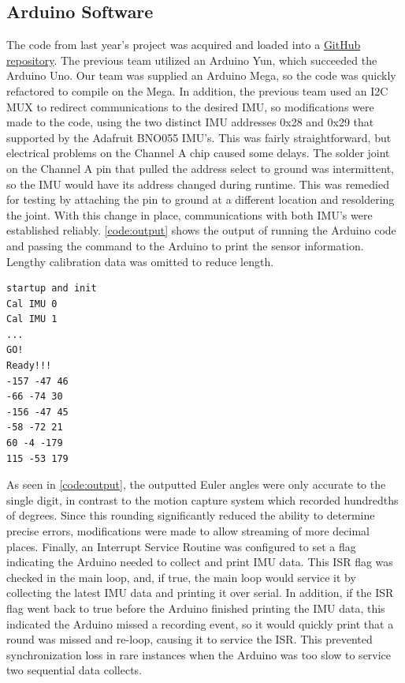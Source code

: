 \documentclass[letterpaper, 10 pt, conference]{ieeeconf}  %
\begin{document}
\subsection{Arduino Software}
The code from last year's project was acquired and loaded into a \href{https://github.com/ChrisBove/HandPoseTracking/}{GitHub repository}. The previous team utilized an Arduino Yun, which succeeded the Arduino Uno. Our team was supplied an Arduino Mega, so the code was quickly refactored to compile on the Mega. In addition, the previous team used an I2C MUX to redirect communications to the desired IMU, so modifications were made to the code, using the two distinct IMU addresses 0x28 and 0x29 that supported by the Adafruit BNO055 IMU's. This was fairly straightforward, but electrical problems on the Channel A chip caused some delays. The solder joint on the Channel A pin that pulled the address select to ground was intermittent, so the IMU would have its address changed during runtime. This was remedied for testing by attaching the pin to ground at a different location and resoldering the joint. With this change in place, communications with both IMU's were established reliably. \autoref{code:output} shows the output of running the Arduino code and passing the command to the Arduino to print the sensor information. Lengthy calibration data was omitted to reduce length.

\begin{lstlisting}[frame=single, basicstyle=\small]
startup and init
Cal IMU 0
Cal IMU 1
...
GO!
Ready!!!
-157 -47 46
-66 -74 30
-156 -47 45
-58 -72 21
60 -4 -179
115 -53 179
\end{lstlisting}

As seen in \autoref{code:output}, the outputted Euler angles were only accurate to the single digit, in contrast to the motion capture system which recorded hundredths of degrees. Since this rounding significantly reduced the ability to determine precise errors, modifications were made to allow streaming of more decimal places. Finally, an Interrupt Service Routine was configured to set a flag indicating the Arduino needed to collect and print IMU data. This ISR flag was checked in the main loop, and, if true, the main loop would service it by collecting the latest IMU data and printing it over serial. In addition, if the ISR flag went back to true before the Arduino finished printing the IMU data, this indicated the Arduino missed a recording event, so it would quickly print that a round was missed and re-loop, causing it to service the ISR. This prevented synchronization loss in rare instances when the Arduino was too slow to service two sequential data collects.
\end{document}
